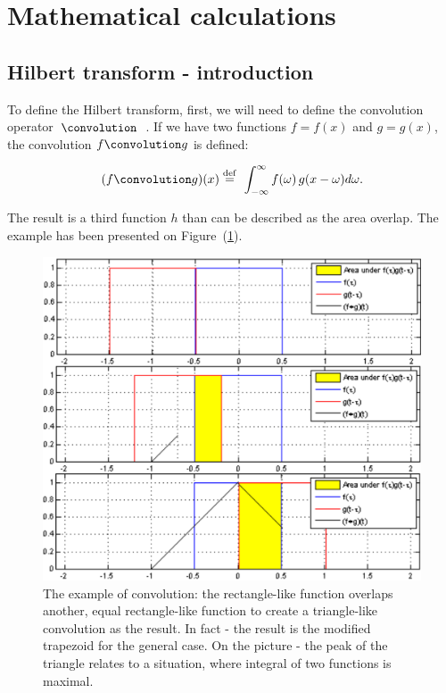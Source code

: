 \documentclass[12pt,twoside,a4paper]{article}
\numberwithin{equation}{subsection}
\numberwithin{figure}{subsection}
\begin{document}
\section{Mathematical calculations} \label{chap:mathematical_calculations}

\subsection{Hilbert transform - introduction}  \label{chap:mathematical_hilbert}

To define the Hilbert transform, first, we will need to define the convolution operator~$\convolution$~\cite{bracewell_fourier}. If we have two functions $f = f(x)$ and $g = g(x)$, the convolution $f \convolution g $ is defined:

\begin{equation} \label{eh:mth_convolution}
	(f \convolution g)(x) \stackrel{\mathrm{def}}{=}\  \int_{-\infty }^{\infty } f(\omega) \, g(x - \omega) d\omega .
\end{equation}
 
The result is a third function $h$ than can be described as the area overlap. The example has been presented on Figure~(\ref{fig:mathematical_convolution}).

\begin{figure} 
	\begin{center}
		\includegraphics[width=150mm]{img/nlo1.png}
		\caption{The example of convolution: the rectangle-like function overlaps another, equal rectangle-like function to create a triangle-like convolution as the result. In fact - the result is the modified trapezoid for the general case. On the picture - the peak of the triangle relates to a situation, where integral of two functions is maximal.  \label{fig:mathematical_convolution}}
	\end{center}
\end{figure}  
\end{document}
